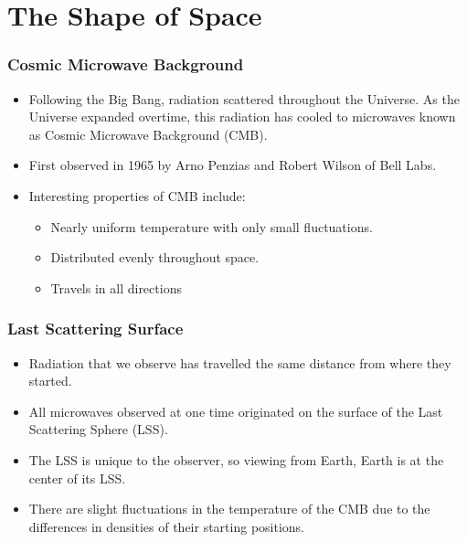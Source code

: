\documentclass[13pt]{beamer}
\begin{document}
\section{The Shape of Space} %
\begin{frame}
\frametitle{Cosmic Microwave Background}
  \begin{itemize}
    \item Following the Big Bang, radiation scattered throughout the Universe. As the Universe expanded overtime, this radiation has cooled to microwaves known as \alert{Cosmic Microwave Background (CMB)}.
    \item First observed in 1965 by Arno Penzias and Robert Wilson of Bell Labs.
    \item Interesting properties of CMB include:
          \begin{itemize}
            \item Nearly uniform temperature with only small fluctuations.
            \item Distributed evenly throughout space.
            \item Travels in all directions
          \end{itemize}
  \end{itemize}
\end{frame}

\begin{frame}
\frametitle{Last Scattering Surface}
  \begin{itemize}
    \item Radiation that we observe has travelled the same distance from where they started.
    \item All microwaves observed at one time originated on the surface of the \alert{Last Scattering Sphere (LSS)}.
    \item The LSS is unique to the observer, so viewing from Earth, Earth is at the center of its LSS.
    \item There are slight fluctuations in the temperature of the CMB due to the differences in densities of their starting positions.
  \end{itemize}

\end{frame}
\end{document}
